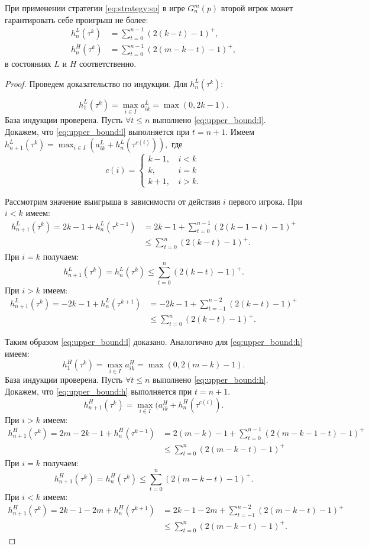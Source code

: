 \begin{utver}
При применении стратегии \eqref{eq:strategy:sp} в игре $ G_n^m(p) $ второй игрок может гарантировать себе проигрыш не более:
\begin{align}
\label{eq:upper_bound:l}
h_n^L(\tau^k) &= \sum_{t=0}^{n-1}
    (2(k - t) - 1)^+,\\
\label{eq:upper_bound:h}
h_n^H(\tau^k) &= \sum_{t=0}^{n-1}
    (2(m - k - t) - 1)^+,
\end{align}
в состояниях $ L $ и $ H $ соответственно.
\end{utver}
\begin{proof}
Проведем доказательство по индукции.
Для $ h_n^L(\tau^k) $:

\[ 
h_1^L(\tau^k) = \max_{i \in I} a_{ik}^L = \max(0, 2k - 1).
\]
База индукции проверена.
Пусть $ \forall t \leq n $ выполнено \eqref{eq:upper_bound:l}. 
Докажем, что \eqref{eq:upper_bound:l} выполняется при $ t=n+1 $. Имеем
$
h_{n+1}^L(\tau^k) = \max_{i \in I} (a_{ik}^L + h_n^L(\tau^{c(i)})),
$
где
\[ 
c(i) = \begin{cases}
    k - 1, &\, i < k \\
    k, &\, i = k \\
    k + 1, &\, i > k.
\end{cases}
\]

Рассмотрим значение выигрыша в зависимости от действия $ i $ первого игрока. 
При $ i < k $ имеем:
\begin{align*}
  h_{n+1}^L(\tau^k) = 2k - 1 + h_n^L(\tau^{k-1}) &= 2k - 1 + \sum_{t = 0}^{n-1} (2(k-1-t)-1)^+ \\
  &\leq \sum_{t = 0}^n (2(k-t) - 1)^+.
\end{align*}
При $ i = k $ получаем:
\[
  h_{n+1}^L(\tau^k) = h_n^L(\tau^k) \leq \sum_{t=0}^n(2(k-t)-1)^+.
\]
При $ i > k $ имеем:
\begin{align*}
  h_{n+1}^L(\tau^k) = -2k - 1 + h_n^L(\tau^{k+1}) &= -2k - 1 + \sum_{t = -1}^{n-2} (2(k-t)-1)^+ \\
  &\leq \sum_{t=0}^n(2(k-t)-1)^+.
\end{align*}

Таким образом \eqref{eq:upper_bound:l} доказано.
Аналогично для \eqref{eq:upper_bound:h} имеем:
\[
  h_1^H(\tau^k) = \max_{i \in I} a_{ik}^H = \max(0, 2(m - k) - 1).
\]
База индукции проверена.
Пусть $ \forall t \leq n $ выполнено \eqref{eq:upper_bound:h}. Докажем, что \eqref{eq:upper_bound:h} выполняется при $ t = n + 1 $.
\[
h_{n+1}^H(\tau^k) = \max_{i \in I}(a_{ik}^H + h_n^H(\tau^{c(i)}).
\]
При $ i > k $ имеем:
\begin{align*}
  h_{n+1}^H(\tau^k) = 2m - 2k - 1 + h_n^H(\tau^{k-1}) &= 2(m-k)- 1 + \sum_{t = 0}^{n-1}(2(m-k-1-t)-1)^+ \\
  &\leq \sum_{t = 0}^n (2(m-k-t) - 1)^+
\end{align*}
При $ i = k $ получаем:
\[
  h_{n+1}^H(\tau^k) = h_n^H(\tau^k) \leq \sum_{t=0}^n(2(m-k-t)-1)^+.
\]
При $ i < k $ имеем:
\begin{align*}
  h_{n+1}^H(\tau^k) = 2k - 1 - 2m + h_n^H(\tau^{k+1}) &= 2k - 1 - 2m + \sum_{t = -1}^{n-2} (2(m-k-t)-1)^+ \\
  &\leq \sum_{t=0}^n(2(m-k-t)-1)^+.
\end{align*}


\end{proof}
